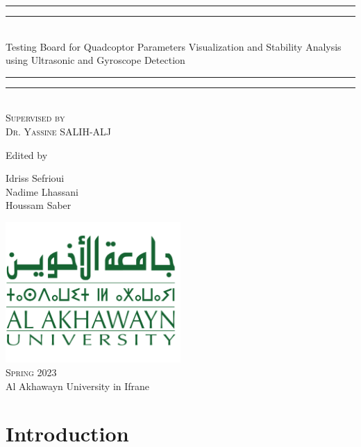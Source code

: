 \documentclass[12pt]{article}
\numberwithin{equation}{section}
\begin{document}
\begin{titlepage}


    \centering
    \vspace*{\baselineskip}
    \rule{\textwidth}{1.6pt}\vspace*{-\baselineskip}\vspace*{2pt}
    \rule{\textwidth}{0.4pt}\\[\baselineskip]
    {\LARGE Testing Board for Quadcoptor Parameters Visualization and Stability Analysis using Ultrasonic and Gyroscope Detection} 
    \rule{\textwidth}{0.4pt}\vspace*{-\baselineskip}\vspace{3.2pt}
    \rule{\textwidth}{1.6pt}\\[\baselineskip]
    \scshape
    Supervised by \\[\baselineskip] {\Large Dr. Yassine SALIH-ALJ}\par
    \vspace*{2\baselineskip}
    Edited by \\[\baselineskip]
    {\Large Idriss Sefrioui \\ Nadime Lhassani \\ Houssam Saber\par}
    \vfill
    \includegraphics[width=0.5\textwidth]{Figures/AUI.png}\\
    {\scshape Spring 2023} \\
    {\large Al Akhawayn University in Ifrane}\par
  \end{titlepage}


\newpage

\tableofcontents
\newpage
\listoffigures
\newpage

\section{Introduction}
\end{document}
